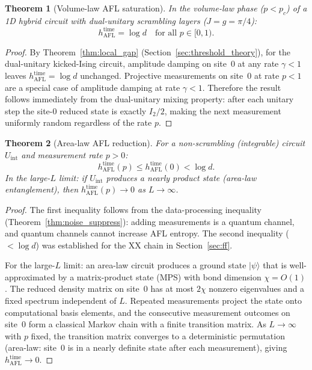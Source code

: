 \documentclass[12pt,a4paper]{article}
\newtheorem{theorem}{Theorem}[section]
\begin{document}
\begin{theorem}[Volume-law AFL saturation]
\label{thm:vol_law_afl}
In the volume-law phase ($p<p_c$) of a 1D hybrid circuit with
dual-unitary scrambling layers ($J=g=\pi/4$):
\[
  h_{\mathrm{AFL}}^{\mathrm{time}} = \log d
  \quad \text{for all } p \in [0,1).
\]
\end{theorem}
\begin{proof}
By Theorem~\ref{thm:local_gap} (Section~\ref{sec:threshold_theory}), for
the dual-unitary kicked-Ising circuit, amplitude damping on site~$0$ at
any rate $\gamma<1$ leaves $h_{\mathrm{AFL}}^{\mathrm{time}} = \log d$
unchanged.  Projective measurements on site~$0$ at rate $p<1$ are a
special case of amplitude damping at rate $\gamma < 1$.  Therefore the
result follows immediately from the dual-unitary mixing property: after
each unitary step the site-$0$ reduced state is exactly $I_2/2$, making
the next measurement uniformly random regardless of the rate $p$.
\end{proof}

\begin{theorem}[Area-law AFL reduction]
\label{thm:area_law_afl}
For a non-scrambling (integrable) circuit $U_{\mathrm{int}}$ and
measurement rate $p>0$:
\[
  h_{\mathrm{AFL}}^{\mathrm{time}}(p) \leq h_{\mathrm{AFL}}^{\mathrm{time}}(0)
  < \log d.
\]
In the large-$L$ limit: if $U_{\mathrm{int}}$ produces a nearly product
state (area-law entanglement), then
$h_{\mathrm{AFL}}^{\mathrm{time}}(p) \to 0$ as $L\to\infty$.
\end{theorem}
\begin{proof}
The first inequality follows from the data-processing inequality
(Theorem~\ref{thm:noise_suppress}): adding measurements is a quantum
channel, and quantum channels cannot increase AFL entropy.  The second
inequality ($< \log d$) was established for the XX chain in
Section~\ref{sec:ff}.

For the large-$L$ limit: an area-law circuit produces a ground state
$|\psi\rangle$ that is well-approximated by a matrix-product state (MPS)
with bond dimension $\chi = O(1)$.  The reduced density matrix on site~$0$
has at most $2\chi$ nonzero eigenvalues and a fixed spectrum independent
of $L$.  Repeated measurements project the state onto computational basis
elements, and the consecutive measurement outcomes on site~$0$ form a
classical Markov chain with a finite transition matrix.  As $L\to\infty$
with $p$ fixed, the transition matrix converges to a deterministic
permutation (area-law: site~$0$ is in a nearly definite state after each
measurement), giving $h_{\mathrm{AFL}}^{\mathrm{time}}\to 0$.
\end{proof}
\end{document}
